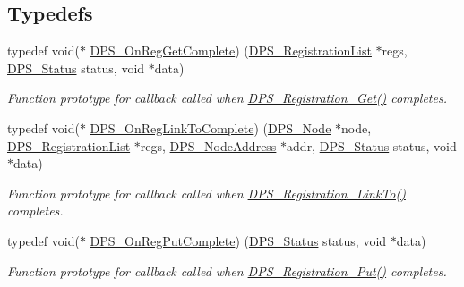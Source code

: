 \subsection*{Typedefs}
\begin{DoxyCompactItemize}
\item 
typedef void($\ast$ \hyperlink{group__registration_gad6b4f95f999e950345587b5ae2de69e2}{D\+P\+S\+\_\+\+On\+Reg\+Get\+Complete}) (\hyperlink{group__registration_ga2b9489ff306ad253d24b03c418a6eda0}{D\+P\+S\+\_\+\+Registration\+List} $\ast$regs, \hyperlink{group__status_ga30395a84d3cad9d4ec29848106415038}{D\+P\+S\+\_\+\+Status} status, void $\ast$data)
\begin{DoxyCompactList}\small\item\em Function prototype for callback called when \hyperlink{group__registration_ga7288d76e731feb67b22951d7d1966311}{D\+P\+S\+\_\+\+Registration\+\_\+\+Get()} completes. \end{DoxyCompactList}\item 
typedef void($\ast$ \hyperlink{group__registration_gaaa0a8c9235e57aaf3e95dc3ecbf13c53}{D\+P\+S\+\_\+\+On\+Reg\+Link\+To\+Complete}) (\hyperlink{group__node_ga4dd612ab965134321bb57fdb065f121c}{D\+P\+S\+\_\+\+Node} $\ast$node, \hyperlink{group__registration_ga2b9489ff306ad253d24b03c418a6eda0}{D\+P\+S\+\_\+\+Registration\+List} $\ast$regs, \hyperlink{group__nodeaddress_ga9e9f56aa38e82b4edcef7eb81e9f5bd2}{D\+P\+S\+\_\+\+Node\+Address} $\ast$addr, \hyperlink{group__status_ga30395a84d3cad9d4ec29848106415038}{D\+P\+S\+\_\+\+Status} status, void $\ast$data)
\begin{DoxyCompactList}\small\item\em Function prototype for callback called when \hyperlink{group__registration_ga73550318aa9625aff612e549e9854e0c}{D\+P\+S\+\_\+\+Registration\+\_\+\+Link\+To()} completes. \end{DoxyCompactList}\item 
typedef void($\ast$ \hyperlink{group__registration_ga8f1d316de08b7dea7dfe55ae814e0219}{D\+P\+S\+\_\+\+On\+Reg\+Put\+Complete}) (\hyperlink{group__status_ga30395a84d3cad9d4ec29848106415038}{D\+P\+S\+\_\+\+Status} status, void $\ast$data)
\begin{DoxyCompactList}\small\item\em Function prototype for callback called when \hyperlink{group__registration_gac412d38875c80431c558773a42ba0766}{D\+P\+S\+\_\+\+Registration\+\_\+\+Put()} completes. \end{DoxyCompactList}\item 

\end{DoxyCompactItemize}
